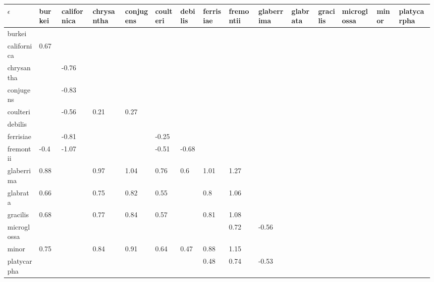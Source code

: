 \begin{table}[ht]
\centering
\begingroup\fontsize{5pt}{5pt}\selectfont
\begin{tabular}{lllllllllllllll}
  \hline
$\epsilon$ & burkei & californica & chrysantha & conjugens & coulteri & debilis & ferrisiae & fremontii & glaberrima & glabrata & gracilis & microglossa & minor & platycarpha \\ 
  \hline
burkei &  &  &  &  &  &  &  &  &  &  &  &  &  &  \\ 
  californica & 0.67 &  &  &  &  &  &  &  &  &  &  &  &  &  \\ 
  chrysantha &  & -0.76 &  &  &  &  &  &  &  &  &  &  &  &  \\ 
  conjugens &  & -0.83 &  &  &  &  &  &  &  &  &  &  &  &  \\ 
  coulteri &  & -0.56 & 0.21 & 0.27 &  &  &  &  &  &  &  &  &  &  \\ 
  debilis &  &  &  &  &  &  &  &  &  &  &  &  &  &  \\ 
  ferrisiae &  & -0.81 &  &  & -0.25 &  &  &  &  &  &  &  &  &  \\ 
  fremontii & -0.4 & -1.07 &  &  & -0.51 & -0.68 &  &  &  &  &  &  &  &  \\ 
  glaberrima & 0.88 &  & 0.97 & 1.04 & 0.76 & 0.6 & 1.01 & 1.27 &  &  &  &  &  &  \\ 
  glabrata & 0.66 &  & 0.75 & 0.82 & 0.55 &  & 0.8 & 1.06 &  &  &  &  &  &  \\ 
  gracilis & 0.68 &  & 0.77 & 0.84 & 0.57 &  & 0.81 & 1.08 &  &  &  &  &  &  \\ 
  microglossa &  &  &  &  &  &  &  & 0.72 & -0.56 &  &  &  &  &  \\ 
  minor & 0.75 &  & 0.84 & 0.91 & 0.64 & 0.47 & 0.88 & 1.15 &  &  &  &  &  &  \\ 
  platycarpha &  &  &  &  &  &  & 0.48 & 0.74 & -0.53 &  &  &  &  &  \\ 
   \hline
\end{tabular}
\endgroup
\end{table}
